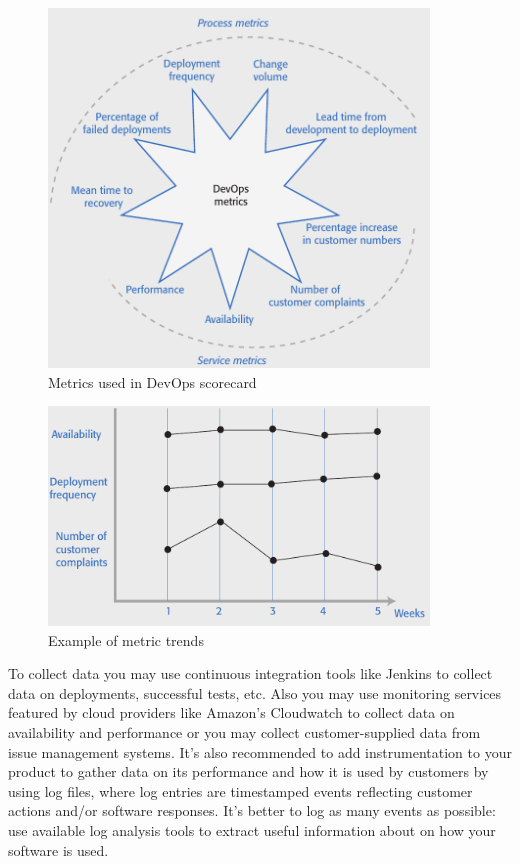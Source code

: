 \documentclass[10pt,a4paper]{report}
\begin{document}
\begin{figure}[h]
	\centering
	\includegraphics[width=0.9\textwidth]{image102}
	\caption{Metrics used in DevOps scorecard}
	\label{image102}
\end{figure} 
\begin{figure}[h]
	\centering
	\includegraphics[width=0.9\textwidth]{image103}
	\caption{Example of metric trends}
	\label{image103}
\end{figure} 


To collect data you may use continuous integration tools like Jenkins to collect data
on deployments, successful tests, etc. Also you may use monitoring services featured by cloud providers like Amazon’s Cloudwatch to collect data on availability and performance or you may collect customer-supplied data from issue management systems. It's also recommended to add instrumentation to your product to gather data on its
performance and how it is used by customers by using log files, where log entries are timestamped events reflecting customer actions and/or software responses. It's better to log as many events as possible: use available log analysis tools to extract useful information about on how your software is
used.
\end{document}
